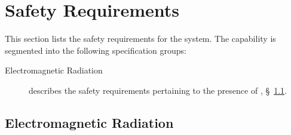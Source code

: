 \KNEADSECTIONNEWPAGE
\section{Safety Requirements}
\label{lab:sec_Safety}


This section lists the safety requirements for the system. The \ThisSys capability is segmented into the following specification groups:

\begin{description}
	\item [Electromagnetic Radiation] describes the safety requirements pertaining to the presence of \EMR, \S~\ref{loc:SAFETY_EMR}.
\end{description}

\KNEADSUBSECTIONNEWPAGE
\subsection{Electromagnetic Radiation}
\label{loc:SAFETY_EMR}



%
%


